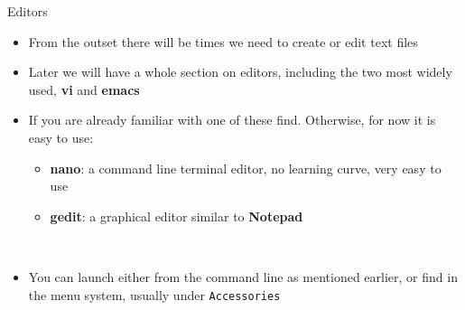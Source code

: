 \begin{frame}
   {Editors}
   \begin{itemize}
      \item
      From the outset there will be times we need to create or
      edit text files
      \item
      Later we will have a whole section on editors, including
      the two most widely used, \textbf{vi} and \textbf{emacs}
      \item
      If you are already familiar with one of these find.  Otherwise,
      for now it is easy to use:
      \begin{itemize}
         \item
         \textbf{nano}: a command line terminal editor, no
         learning curve, very easy to use
         \item
         \textbf{gedit}: a graphical editor similar to
         \textbf{Notepad}
      \end{itemize}      \
      \item You can launch either from the command line as
      mentioned earlier, or find in the menu system, usually
      under \verb?Accessories?
   \end{itemize}

\end{frame}

\cprotect{}

